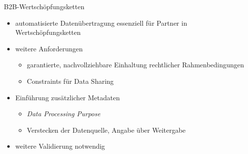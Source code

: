 \begin{frame}{B2B-Wertschöpfungsketten \footnotesize\cite{bothSolidBasedB2BData2025}}
    \begin{itemize}
        \item automatisierte Datenübertragung essenziell für Partner in Wertschöpfungsketten
        \item weitere Anforderungen
        \begin{itemize}
            \item garantierte, nachvollziehbare Einhaltung rechtlicher Rahmenbedingungen
            \item Constraints für Data Sharing
        \end{itemize}
    \end{itemize}
    
    \pause
    \begin{itemize}
        \item Einführung zusätzlicher Metadaten
        \begin{itemize}
            \item \emph{Data Processing Purpose}
            \item Verstecken der Datenquelle, Angabe über Weitergabe
        \end{itemize}
    \end{itemize}
    
    \pause
    \begin{itemize}
        \item weitere Validierung notwendig
    \end{itemize}
\end{frame}
